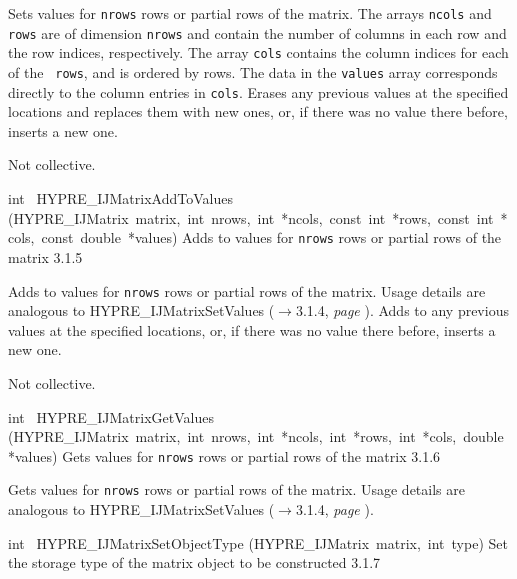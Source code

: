 \documentclass{article}
\begin{document}
\begin{cxxentry}
\begin{cxxentry}
\begin{cxxfunction}
\begin{cxxdoc}
Sets values for {\tt nrows} rows or partial rows of the matrix.  
The arrays {\tt ncols}
and {\tt rows} are of dimension {\tt nrows} and contain the number
of columns in each row and the row indices, respectively.  The
array {\tt cols} contains the column indices for each of the {\tt
rows}, and is ordered by rows.  The data in the {\tt values} array
corresponds directly to the column entries in {\tt cols}.  Erases
any previous values at the specified locations and replaces them
with new ones, or, if there was no value there before, inserts a
new one.

Not collective.
\end{cxxdoc}
\end{cxxfunction}
\begin{cxxfunction}
{int\ }
        {HYPRE\_IJMatrixAddToValues}
        {(HYPRE\_IJMatrix\ matrix,\ int\ nrows,\ int\ *ncols,\ const\ int\ *rows,\ const\ int\ *cols,\ const\ double\ *values)}
        {
Adds to values for {\tt nrows} rows or partial rows of the matrix}
        {3.1.5}
\begin{cxxdoc}

Adds to values for {\tt nrows} rows or partial rows of the matrix.  
Usage details are
analogous to HYPRE\_IJMatrixSetValues ($\rightarrow$3.1.4, {\em page \pageref{cxx.3.1.4}}).  Adds to any previous
values at the specified locations, or, if there was no value there
before, inserts a new one.

Not collective.
\end{cxxdoc}
\end{cxxfunction}
\begin{cxxfunction}
{int\ }
        {HYPRE\_IJMatrixGetValues}
        {(HYPRE\_IJMatrix\ matrix,\ int\ nrows,\ int\ *ncols,\ int\ *rows,\ int\ *cols,\ double\ *values)}
        {
Gets values for {\tt nrows} rows or partial rows of the matrix}
        {3.1.6}
\begin{cxxdoc}

Gets values for {\tt nrows} rows or partial rows of the matrix.  
Usage details are
analogous to HYPRE\_IJMatrixSetValues ($\rightarrow$3.1.4, {\em page \pageref{cxx.3.1.4}}).
\end{cxxdoc}
\end{cxxfunction}
\begin{cxxfunction}
{int\ }
        {HYPRE\_IJMatrixSetObjectType}
        {(HYPRE\_IJMatrix\ matrix,\ int\ type)}
        {
Set the storage type of the matrix object to be constructed}
        {3.1.7}
\begin{cxxdoc}


\end{cxxdoc}
\end{cxxfunction}
\end{cxxentry}
\end{cxxentry}
\end{document}
